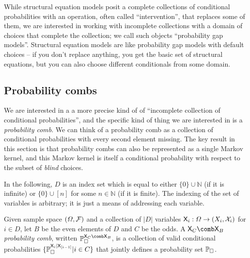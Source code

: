 
While structural equation models posit a complete collections of conditional probabilities with an operation, often called ``intervention'', that replaces some of them, we are interested in working with incomplete collections with a domain of choices that complete the collection; we call such objects ``probability gap models''. Structural equation models are like probability gap models with default choices -- if you don't replace anything, you get the basic set of structural equations, but you can also choose different conditionals from some domain.

\subsection{Probability combs}

We are interested in a a more precise kind of of ``incomplete collection of conditional probabilities'', and the specific kind of thing we are interested in is a \emph{probability comb}. We can think of a probability comb as a collection of conditional probabilities with every second element missing. The key result in this section is that probability combs can also be represented as a single Markov kernel, and this Markov kernel is itself a conditional probability with respect to the subset of \emph{blind} choices.

In the following, $D$ is an index set which is equal to either $\{0\}\cup\mathbb{N}$ (if it is infinite) or $\{0\}\cup[n]$ for some $n\in \mathbb{N}$ (if it is finite). The indexing of the set of variables is arbitrary; it is just a means of addressing each variable.

\begin{definition}
Given sample space $(\Omega,\mathcal{F})$ and a collection of $|D|$ variables $\mathsf{X}_{i}:\Omega\to (X_i,\mathcal{X}_i)$ for $i\in D$, let $B$ be the even elements of $D$ and $C$ be the odds. A $\RV{X}_C\comb \RV{X}_B$ \emph{probability comb}, written $\prob{P}_\square^{\RV{X}_C\comb \RV{X}_B}$, is a collection of valid conditional probabilities $\{\mathbb{P}_\square^{\mathsf{X}_{i}|\mathsf{X}_{[i-1]}}|i\in C\}$ that jointly defines a probability set $\mathbb{P}_{\square}$.
\end{definition}



